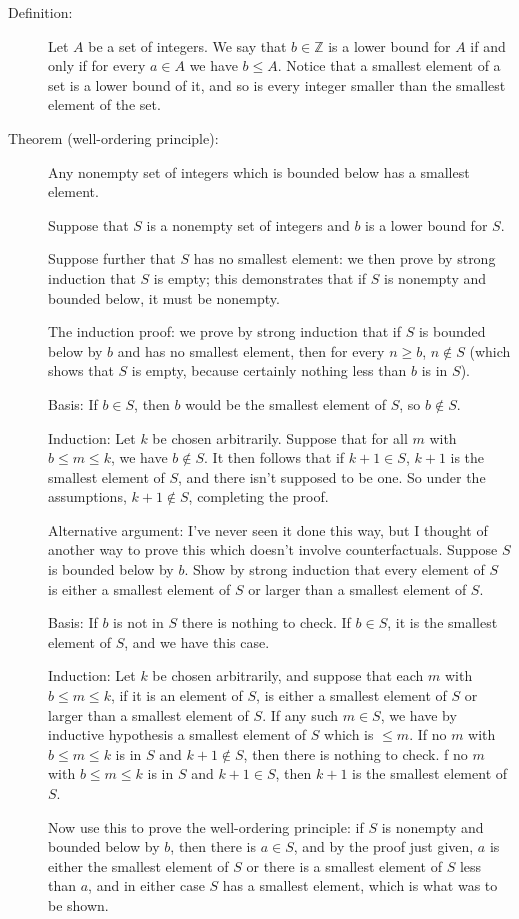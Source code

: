 \documentclass[12pt]{article}
\begin{document}
\begin{description}

\item[Definition:]  Let $A$ be a set of integers.  We say that $b \in \mathbb Z$ is a lower bound for $A$ if and only if
for every $a \in A$ we have $b \leq A$.  Notice that a smallest element of a set is a lower bound of it, and so is every integer smaller than the smallest element of the set.

\item[Theorem (well-ordering principle):]  Any nonempty set of integers which is bounded below has a smallest element.

Suppose that $S$ is a nonempty set of integers and $b$ is a lower bound for $S$.

Suppose further that $S$ has no smallest element:  we then prove by strong induction that $S$ is empty;  this demonstrates that if $S$ is nonempty and bounded below, it must be nonempty.

The induction proof:  we prove by strong induction that if $S$ is bounded below by $b$ and has no smallest element,
then for every $n \geq b$, $n \not\in S$ (which shows that $S$ is empty, because certainly nothing less than $b$ is in $S$).

Basis:  If $b \in S$, then $b$ would be the smallest element of $S$, so $b \not\in S$.

Induction:  Let $k$ be chosen arbitrarily.  Suppose that for all $m$ with $b \leq m \leq k$, we have $b \not\in S$.
It then follows that if $k+1 \in S$, $k+1$ is the smallest element of $S$, and there isn't supposed to be one.  So under the assumptions, $k+1 \not\in S$, completing the proof.

Alternative argument:  I've never seen it done this way, but I thought of another way to prove this which doesn't involve counterfactuals.
Suppose $S$ is bounded below by $b$.  Show by strong induction that every element of $S$ is either a smallest element of $S$ or larger than a smallest element of $S$.

Basis:  If $b$ is not in $S$ there is nothing to check.  If $b \in S$, it is the smallest element of $S$, and we have this case.

Induction:  Let $k$ be chosen arbitrarily, and suppose that each $m$ with $b \leq m \leq k$, if it is an element of $S$, is either a smallest element of $S$ or larger than a smallest element of $S$.  If any such $m \in S$, we have by inductive hypothesis a smallest element of $S$ which is $\leq m$.  If no $m$ with $b \leq m \leq k$ is in $S$ and
$k+1 \not\in S$, then there is nothing to check.  f no $m$ with $b \leq m \leq k$ is in $S$ and
$k+1 \in S$, then $k+1$ is the smallest element of $S$. 

Now use this to prove the well-ordering principle:  if $S$ is nonempty and bounded below by $b$, then there is $a \in S$, and by the proof just given, $a$ is either the smallest element of $S$ or there is a smallest element of $S$ less than $a$, and in either case $S$ has a smallest element, which is what was to be shown.

\end{description}
\end{document}
